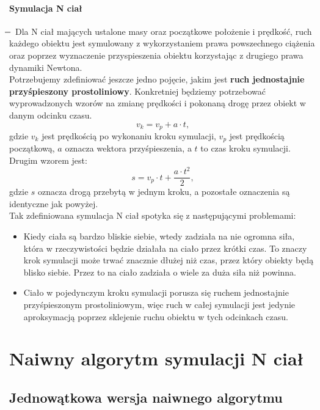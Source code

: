 \documentclass[14pt,twoside,a4paper]{article}
\theoremstyle{definition}
\begin{document}
\paragraph{Symulacja N ciał} 
\newcommand{\mi}{\boldsymbol{} \mathrel{\mkern -16mu} \boldsymbol{-}}
$\mi$
Dla N ciał mających ustalone masy oraz początkowe położenie i prędkość, ruch każdego obiektu jest symulowany z wykorzystaniem prawa powszechnego ciążenia oraz poprzez wyznaczenie przyspieszenia obiektu korzystając z drugiego prawa dynamiki Newtona.\\
\bigskip
Potrzebujemy zdefiniować jeszcze jedno pojęcie, jakim jest \textbf{ruch jednostajnie przyśpieszony prostoliniowy}.
Konkretniej będziemy potrzebować wyprowadzonych wzorów na zmianę prędkości i pokonaną drogę przez obiekt w danym odcinku czasu.
$$v_k = v_p + a\cdot t,$$ gdzie $v_k$ jest prędkością po wykonaniu kroku symulacji, $v_p$ jest prędkością początkową, $a$ oznacza wektora przyśpieszenia, a $t$ to czas kroku symulacji.\\
Drugim wzorem jest:
$$s = v_p\cdot t + \frac{a\cdot t^2}{2},$$ gdzie $s$ oznacza drogą przebytą w jednym kroku, a pozostałe oznaczenia są identyczne jak powyżej.\\


Tak zdefiniowana symulacja N ciał spotyka się z następującymi problemami:
\begin{itemize}
\item Kiedy ciała są bardzo bliskie siebie, wtedy zadziała na nie ogromna siła, która w rzeczywistości będzie działała na ciało przez krótki czas. To znaczy krok symulacji może trwać znacznie dłużej niż czas, przez który obiekty będą blisko siebie. Przez to na ciało zadziała o wiele za duża siła niż powinna.
\item Ciało w pojedynczym kroku symulacji porusza się ruchem jednostajnie przyśpieszonym prostoliniowym, więc ruch w całej symulacji jest jedynie aproksymacją poprzez sklejenie ruchu obiektu w tych odcinkach czasu.
\end{itemize}

\section{\LARGE Naiwny algorytm symulacji N ciał}
\bigskip

\subsection{\Large Jednowątkowa wersja naiwnego algorytmu}
\end{document}

